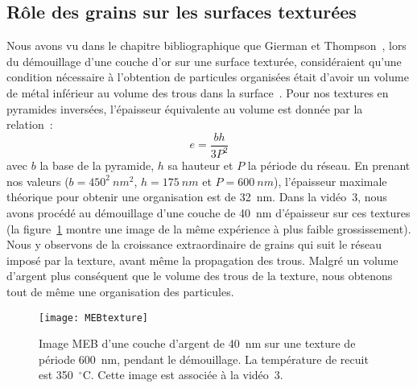 \subsection{Rôle des grains sur les surfaces texturées}
Nous avons vu dans le chapitre bibliographique que Gierman et Thompson~\cite{giermann2005solid, giermann2011requirements}, lors du démouillage d'une couche d'or sur une surface texturée, considéraient qu'une condition nécessaire à l'obtention de particules organisées était d'avoir un volume de métal inférieur au volume des trous dans la surface~\cite{giermann2005solid}. Pour nos textures en pyramides inversées, l'épaisseur équivalente au volume est donnée par la relation~:
\begin{equation}
e = \dfrac{bh}{3P^2}
\end{equation}
avec $b$ la base de la pyramide, $h$ sa hauteur et $P$ la période du réseau. En prenant nos valeurs ($b=450^2~nm^2$, $h=175~nm$ et $P=600~nm$), l'épaisseur maximale théorique pour obtenir une organisation est de 32~nm. Dans la vidéo~3, nous avons procédé au démouillage d'une couche de 40~nm d'épaisseur sur ces textures (la figure~\ref{MEBtexture} montre une image de la même expérience à plus faible grossissement). Nous y observons de la croissance extraordinaire de grains qui suit le réseau imposé par la texture, avant même la propagation des trous. Malgré un volume d'argent plus conséquent que le volume des trous de la texture, nous obtenons tout de même une organisation des particules.\par

\begin{figure}[h]
	\centering
	\texttt{[image: MEBtexture]}
	\caption{Image MEB d'une couche d'argent de 40~nm sur une texture de période 600~nm, pendant le démouillage. La température de recuit est 350~$^\circ$C. Cette image est associée à la vidéo~3.}
	\label{MEBtexture}
\end{figure}

